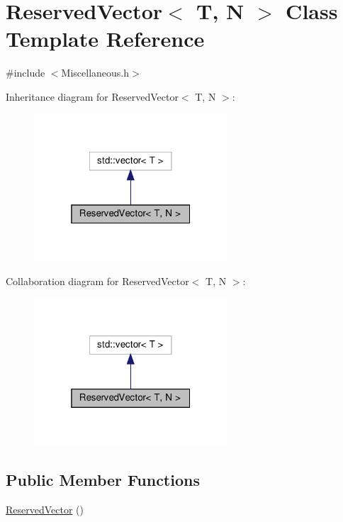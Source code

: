 \hypertarget{class_reserved_vector}{}\section{Reserved\+Vector$<$ T, N $>$ Class Template Reference}
\label{class_reserved_vector}


{\ttfamily \#include $<$Miscellaneous.\+h$>$}



Inheritance diagram for Reserved\+Vector$<$ T, N $>$\+:\nopagebreak
\begin{figure}[H]
\begin{center}
\leavevmode
\includegraphics[width=205pt]{class_reserved_vector__inherit__graph}
\end{center}
\end{figure}


Collaboration diagram for Reserved\+Vector$<$ T, N $>$\+:\nopagebreak
\begin{figure}[H]
\begin{center}
\leavevmode
\includegraphics[width=205pt]{class_reserved_vector__coll__graph}
\end{center}
\end{figure}
\subsection*{Public Member Functions}
\begin{DoxyCompactItemize}
\item 
\hyperlink{class_reserved_vector_aa58994583a0d230b8ebc7ae4d9454465}{Reserved\+Vector} ()
\end{DoxyCompactItemize}


